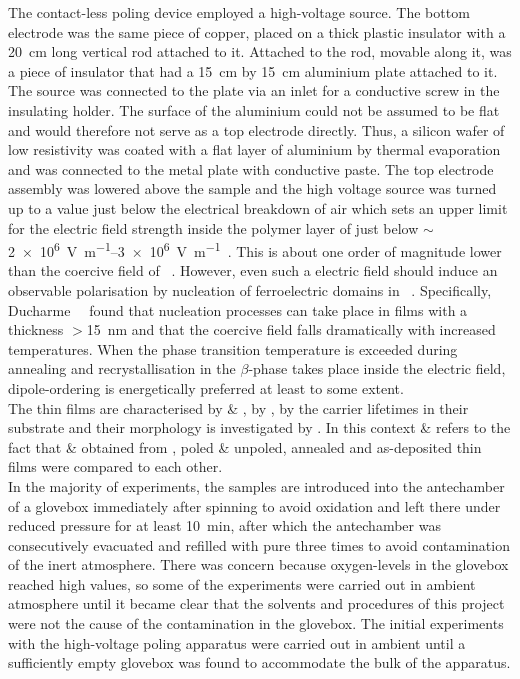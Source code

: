 The contact-less poling device employed a high-voltage source. The bottom electrode was the same piece of copper, placed on a thick plastic insulator with a \SI{20}{\centi\metre} long vertical rod attached to it. Attached to the rod, movable along it, was a piece of insulator that had a \SI{15}{\centi\metre} by \SI{15}{\centi\metre} aluminium plate attached to it. The source was connected to the plate via an inlet for a conductive screw in the insulating holder. The surface of the aluminium could not be assumed to be flat and would therefore not serve as a top electrode directly. Thus, a silicon wafer of low resistivity was coated with a flat layer of aluminium by thermal evaporation and was connected to the metal plate with conductive paste. The top electrode assembly was lowered above the sample and the high voltage source was turned up to a value just below the electrical breakdown of air which sets an upper limit for the electric field strength inside the polymer layer of just below $\sim$\SIrange{2e6}{3e6}{\volt\per\metre}~\cite{airbreakdown}. This is about one order of magnitude lower than the coercive field of \pvtr{}~\cite[p. 813]{encyclopedia}. However, even such a  electric field should induce an observable polarisation by nucleation of ferroelectric domains in \pvdf{}~\cite[pp. 812 ff.]{encyclopedia}. Specifically, Ducharme~\etal{}~\cite{ducharme_finitesize} found that nucleation processes can take place in films with a thickness $>$\SI{15}{\nano\metre} and that the coercive field falls dramatically with increased temperatures. When the phase transition temperature is exceeded during annealing and recrystallisation in the $\beta$-phase takes place inside the electric field, dipole-ordering is energetically preferred at least to some extent.\\
The \pvdf{} thin films are characterised by  \cpd{} \& \spv{}, by \ftir{}, by the  carrier lifetimes in their substrate and their morphology is investigated by \sem{}. In this context  \cpd{} \& \spv{} refers to the fact that \cpd{} \& \spv{} obtained from \sih{}, poled \& unpoled, annealed and as-deposited \pvdf{} thin films were compared to each other.\\
In the majority of experiments, the samples are introduced into the antechamber of a glovebox immediately after spinning to avoid oxidation and left there under reduced pressure for at least \SI{10}{\minute}, after which the antechamber was consecutively evacuated and refilled with pure \nitro{} three times to avoid contamination of the inert atmosphere. There was concern because oxygen-levels in the glovebox reached high values, so some of the experiments were carried out in ambient atmosphere until it became clear that the solvents and procedures of this project were not the cause of the contamination in the glovebox. The initial experiments with the high-voltage poling apparatus were carried out in ambient until a sufficiently empty glovebox was found to accommodate the bulk of the apparatus.\\
